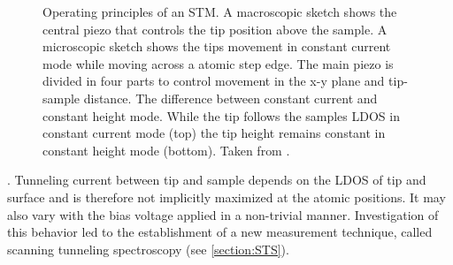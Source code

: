 \begin{figure}\centering
	
	
	\caption{Operating principles of an STM.  A macroscopic sketch  shows the central piezo that controls the tip position above the sample. A microscopic sketch shows the tips movement in constant current mode while moving across a atomic step edge. The main piezo is divided in four parts to control movement in the x-y plane and tip-sample distance\cite{STM-rutgers}.  The difference between constant current and constant height mode. While the tip follows the samples LDOS in constant current mode (top) the tip height remains constant in constant height mode (bottom). Taken from \cite{diss-manuela}.}
	\label{fig:STM-sketch}
\end{figure}


. Tunneling current between tip and sample depends on the LDOS of tip and surface and is therefore not implicitly maximized at the atomic positions. It may also vary with the bias voltage applied in a non-trivial manner. Investigation of this behavior led to the establishment of a new measurement technique, called scanning tunneling spectroscopy (see \autoref{section:STS}). 

